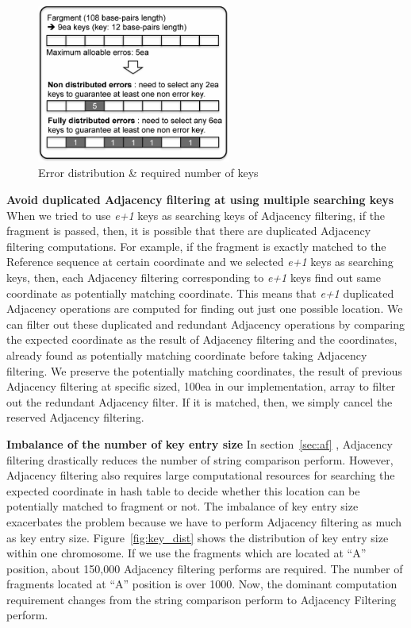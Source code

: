 \begin{figure}[b] \centering \vspace{0.1in}
\includegraphics[width=2.5in]{./figure/pigeon_B.pdf} \vspace{0in}
\caption{Error distribution \& required number of keys}
\label{fig:pigeon} 
\end{figure}

\textbf{Avoid duplicated Adjacency filtering at using multiple searching keys}
When we tried to use \textit{e+1} keys as searching keys of Adjacency
filtering, if the fragment is passed, then, it is possible that there are
duplicated Adjacency filtering computations. For example, if the fragment is
exactly matched to the Reference sequence at certain coordinate and we selected
\textit{e+1} keys as searching keys, then, each Adjacency filtering
corresponding to \textit{e+1} keys find out same coordinate as potentially
matching coordinate. This means that \textit{e+1} duplicated Adjacency
operations are computed for finding out just one possible location. We can
filter out these duplicated and redundant Adjacency operations by comparing the
expected coordinate as the result of Adjacency filtering and the coordinates,
already found as potentially matching coordinate before taking Adjacency
filtering.  We preserve the potentially matching coordinates, the result of
previous Adjacency filtering at specific sized, 100ea in our implementation,
array to filter out the redundant Adjacency filter.  If it is matched, then, we
simply cancel the reserved Adjacency filtering.

\textbf{Imbalance of the number of key entry size} In section~\ref{sec:af} , Adjacency
filtering drastically reduces the number of string comparison perform. However,
Adjacency filtering also requires large computational resources for searching
the expected coordinate in hash table to decide whether this location can be
potentially matched to fragment or not. The imbalance of key entry size
exacerbates the problem because we have to perform Adjacency filtering as much
as key entry size. Figure~\ref{fig:key_dist}  shows the distribution of key
entry size within one chromosome. If we use the fragments which are located at
“A” position, about 150,000 Adjacency filtering performs are required. The
number of fragments located at “A” position is over 1000. Now, the dominant
computation requirement changes from the string comparison perform to Adjacency
Filtering perform.

